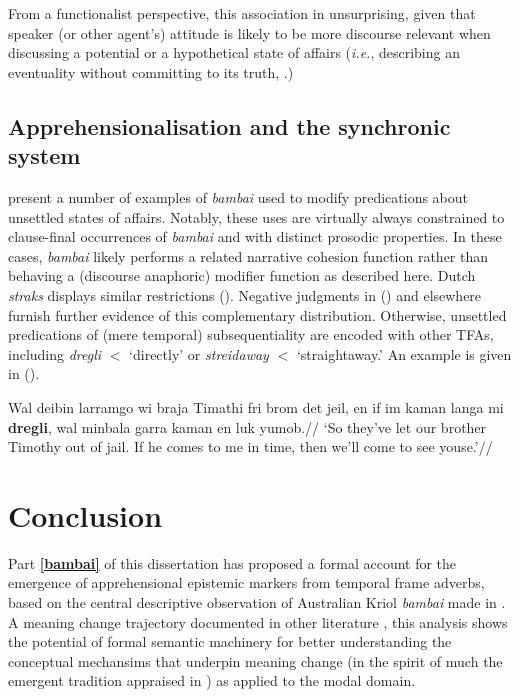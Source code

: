  From a functionalist perspective, this association in unsurprising, given that speaker (or other agent's) attitude is likely to be more discourse relevant when discussing a potential or a hypothetical state of affairs (\textit{i.e.}, describing an eventuality without committing to its truth, \citealp[see also][74-76]{Verstraete2006}.)

\subsection{Apprehensionalisation and the synchronic system}

\citet{Angelo2016} present a number of examples of \textit{bambai} used to modify predications about unsettled states of affairs. Notably, these uses are virtually always constrained to clause-final occurrences of \textit{bambai} and with distinct prosodic properties. In these cases, \textit{bambai} likely performs a related narrative cohesion function rather than behaving a (discourse anaphoric) modifier function as described here. Dutch \textit{straks} displays similar restrictions (). Negative judgments in () and elsewhere furnish further evidence of this complementary distribution. Otherwise, unsettled predications of (mere temporal) subsequentiality are encoded with other TFAs, including \textit{dregli} $ < $ `directly' or \textit{streidaway} $ < $ `straightaway.' An example is given in (\nextx).

\pex\begingl\gla  Wal deibin larramgo wi braja Timathi fri brom det jeil, en if im kaman langa mi \textbf{dregli}, wal minbala garra kaman en luk yumob.//
\glft `So they've let our brother Timothy out of jail. If he comes to me in time, then we'll come to see youse.'\trailingcitation{[KB~Hibrus 13:20]}//\endgl
\xe


\section{Conclusion}\label{bambai.concl}

Part \textbf{\ref{bambai}} of this dissertation has proposed a formal account for the emergence of apprehensional epistemic markers from temporal frame adverbs, based on the central descriptive observation of Australian Kriol \textit{bambai} made in \cite{Angelo2016}. A meaning change trajectory documented in other literature \citep{Kuteva2019a,Kuteva2019,Angelo2018}, this analysis shows the potential of formal semantic machinery for better understanding the conceptual mechansims that underpin  meaning change (in the spirit of much the emergent tradition appraised in \citealt{Deo2015}) as applied to the modal domain. %


